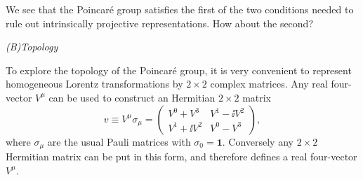 We see that the Poincar\'e group satisfies the first of the two
conditions needed to rule out intrinsically projective representations. How
about the second?

\begin{center}
\emph{(B)\quad Topology}
\end{center}

To explore the topology of the Poincar\'e group, it is very
convenient to represent homogeneous Lorentz transformations by $2\times2$
complex matrices. Any real four-vector $V^\mu$ can be used to construct an
Hermitian $2\times2$ matrix
\begin{equation}
  v\equiv V^\mu\sigma_\mu
    =\begin{pmatrix}
      V^0+V^3 & V^1-\ii V^2\\
      V^1+\ii V^2 & V^0-V^3
    \end{pmatrix},
  \tag{2.7.36}\label{eq:2.7.36}
\end{equation}
where $\sigma_\mu$ are the usual Pauli matrices with
$\sigma_0=\mathbf{1}$. Conversely any $2\times2$ Hermitian matrix can be put in
this form, and therefore defines a real four-vector $V^\mu$.

